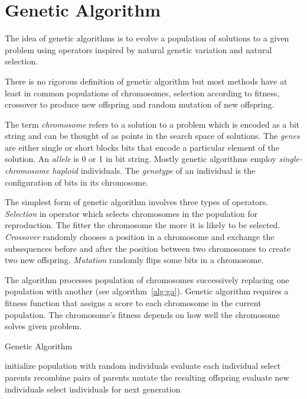 \documentclass{article}
\begin{document}
\section{Genetic Algorithm}

The idea of genetic algorithms is to evolve a population of solutions
to a given problem using operators inspired by natural genetic variation
and natural selection.
\cite{mitchell1996}

There is no rigorous definition of genetic algorithm but most methods
have at least in common populations of chromosomes,
selection according to fitness, crossover to produce new offspring
and random mutation of new offspring.
\cite{mitchell1996}

The term \textit{chromosome} refers to a solution to a problem
which is encoded as a bit string
and can be thought of as points in the search space of solutions.
The \textit{genes} are either single or short blocks bits
that encode a particular element of the solution.
An \textit{allele} is 0 or 1 in bit string.
Mostly genetic algorithms employ \textit{single-chromosome haploid} individuals.
The \textit{genotype} of an individual is the configuration of bits
in its chromosome.
\cite{mitchell1996}

The simplest form of genetic algorithm involves three types of operators.
\textit{Selection} in operator which selects chromosomes in the population for
reproduction.
The fitter the chromosome the more it is likely to be selected.
\textit{Crossover} randomly chooses a position in a chromosome
and exchange the subsequences before and after the position between
two chromosomes to create two new offspring.
\textit{Mutation} randomly flips some bits in a chromosome.
\cite{mitchell1996}

The algorithm processes population of chromosomes successively replacing
one population with another (see algorithm~\ref{alg:ga}).
Genetic algorithm requires a fitness function that assigns a score to
each chromosome in the current population.
The chromosome's fitness depends on how well the chromosome solves given
problem.
\cite{mitchell1996}

\begin{algorithm}[hb]
\caption{Genetic Algorithm~\cite{eiben2003}}
\label{alg:ga}
\begin{algorithmic}
\STATE initialize population with random individuals
\STATE evaluate each individual
\STATE select parents
\STATE recombine pairs of parents
\STATE mutate the resulting offspring
\STATE evaluate new individuals
\STATE select individuals for next generation
\ENDWHILE
\end{algorithmic}
\end{algorithm}
\end{document}
